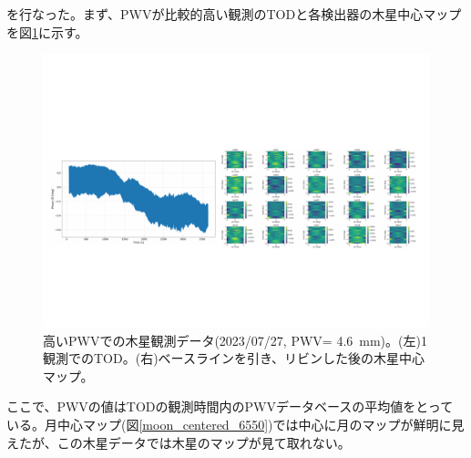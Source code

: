 を行なった。まず、PWVが比較的高い観測のTODと各検出器の木星中心マップを図\ref{5862_jupiter}に示す。
\begin{figure}[htbp]
  \centering
  \includegraphics[width=1.0\columnwidth]{5_alignment/figs/5862_jupiter.pdf}
  \caption{高いPWVでの木星観測データ(2023/07/27, PWV= \SI{4.6}{mm})。(左)1観測でのTOD。(右)ベースラインを引き、リビンした後の木星中心マップ。}
  \label{5862_jupiter}
\end{figure}
ここで、PWVの値はTODの観測時間内のPWVデータベースの平均値をとっている。月中心マップ(図\ref{moon_centered_6550})では中心に月のマップが鮮明に見えたが、この木星データでは木星のマップが見て取れない。

